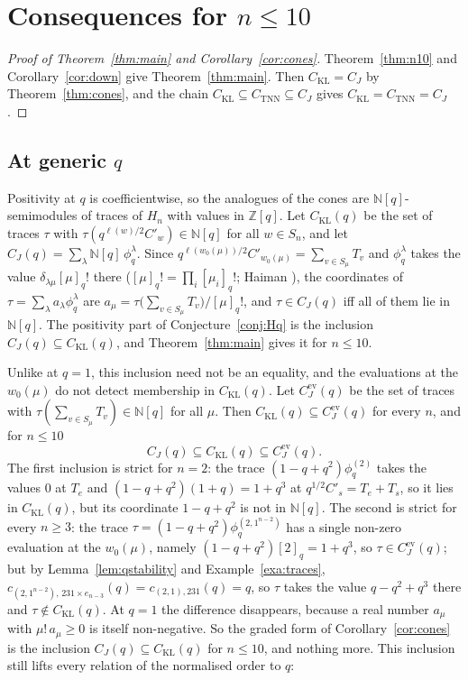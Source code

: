 \documentclass[11pt]{amsart}
\theoremstyle{definition}
\theoremstyle{remark}
\newcommand{\N}{\mathbb{N}}
\newcommand{\Z}{\mathbb{Z}}
\newcommand{\CKL}{C_{\mathrm{KL}}}
\newcommand{\CTNN}{C_{\mathrm{TNN}}}
\newcommand{\CJ}{C_{J}}
\begin{document}
\section{Consequences for \texorpdfstring{$n\le10$}{n<=10}}\label{sec:consequences}

\begin{proof}[Proof of Theorem~\ref{thm:main} and Corollary~\ref{cor:cones}]
Theorem~\ref{thm:n10} and Corollary~\ref{cor:down} give Theorem~\ref{thm:main}. Then $\CKL=\CJ$ by Theorem~\ref{thm:cones}, and the chain $\CKL\subseteq\CTNN\subseteq\CJ$ gives $\CKL=\CTNN=\CJ$.
\end{proof}

\subsection{At generic $q$}
Positivity at $q$ is coefficientwise, so the analogues of the cones are $\N[q]$-semimodules of traces of $H_n$ with values in $\Z[q]$. Let $\CKL(q)$ be the set of traces $\tau$ with $\tau(q^{\ell(w)/2}C'_w)\in\N[q]$ for all $w\in S_n$, and let $\CJ(q)=\sum_\lambda\N[q]\,\phi^\lambda_q$. Since $q^{\ell(w_0(\mu))/2}C'_{w_0(\mu)}=\sum_{v\in S_\mu}T_v$ and $\phi^\lambda_q$ takes the value $\delta_{\lambda\mu}[\mu]_q!$ there ($[\mu]_q!=\prod_i[\mu_i]_q!$; Haiman \cite[Prop.~4.1(1)]{Hai}), the coordinates of $\tau=\sum_\lambda a_\lambda\phi^\lambda_q$ are $a_\mu=\tau\bigl(\sum_{v\in S_\mu}T_v\bigr)/[\mu]_q!$, and $\tau\in\CJ(q)$ iff all of them lie in $\N[q]$. The positivity part of Conjecture~\ref{conj:Hq} is the inclusion $\CJ(q)\subseteq\CKL(q)$, and Theorem~\ref{thm:main} gives it for $n\le10$.

Unlike at $q=1$, this inclusion need not be an equality, and the evaluations at the $w_0(\mu)$ do not detect membership in $\CKL(q)$. Let $\CJ^{\mathrm{ev}}(q)$ be the set of traces with $\tau(\sum_{v\in S_\mu}T_v)\in\N[q]$ for all $\mu$. Then $\CKL(q)\subseteq\CJ^{\mathrm{ev}}(q)$ for every $n$, and for $n\le10$
\[
\CJ(q)\subseteq\CKL(q)\subseteq\CJ^{\mathrm{ev}}(q).
\]
The first inclusion is strict for $n=2$: the trace $(1-q+q^2)\phi^{(2)}_q$ takes the values $0$ at $T_e$ and $(1-q+q^2)(1+q)=1+q^3$ at $q^{1/2}C'_s=T_e+T_s$, so it lies in $\CKL(q)$, but its coordinate $1-q+q^2$ is not in $\N[q]$. The second is strict for every $n\ge3$: the trace $\tau=(1-q+q^2)\phi^{(2,1^{n-2})}_q$ has a single non-zero evaluation at the $w_0(\mu)$, namely $(1-q+q^2)[2]_q=1+q^3$, so $\tau\in\CJ^{\mathrm{ev}}(q)$; but by Lemma~\ref{lem:qstability} and Example~\ref{exa:traces}, $c_{(2,1^{n-2}),\,231\times e_{n-3}}(q)=c_{(2,1),231}(q)=q$, so $\tau$ takes the value $q-q^2+q^3$ there and $\tau\notin\CKL(q)$. At $q=1$ the difference disappears, because a real number $a_\mu$ with $\mu!\,a_\mu\ge0$ is itself non-negative. So the graded form of Corollary~\ref{cor:cones} is the inclusion $\CJ(q)\subseteq\CKL(q)$ for $n\le10$, and nothing more. This inclusion still lifts every relation of the normalised order to $q$:
\end{document}
